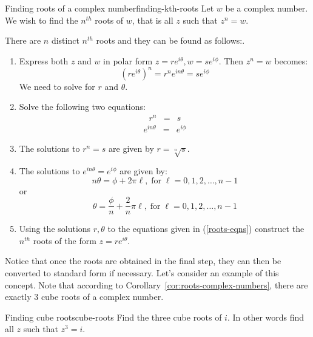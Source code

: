 \begin{procedure}{Finding roots of a complex number}{finding-kth-roots}
Let $w$ be a complex number. We wish to find the $n^{th}$ roots of $w$, that is all $z$ such that $z^n = w$. 

There are $n$ distinct $n^{th}$ roots and they can be found as follows:. 
 
\begin{enumerate}
\item Express both $z$ and $w$ in polar form $z=re^{i\theta}, w=se^{i\phi}$. Then $z^n = w$ becomes:
\[
(re^{i\theta})^n = r^n e^{i n \theta} = se^{i\phi}
\]
We need to solve for $r$ and $\theta$. 
\item Solve the following two equations:
\begin{eqnarray*}
r^n &=& s 
\end{eqnarray*}
\begin{eqnarray}
e^{i n \theta} &=& e^{i \phi}
\label{roots-eqns}
\end{eqnarray}
\item The solutions to $r^n = s$ are given by $r = \sqrt[n]{s}$. 

\item The solutions to $e^{i n \theta} = e^{i \phi}$ are given by:
\[
n\theta = \phi + 2\pi \ell,  \; \mbox{for} \; \ell = 0,1,2,\ldots, n-1
\]
or
\[
\theta = \frac{\phi}{n} + \frac{2}{n} \pi \ell, \; \mbox{for} \; \ell = 0,1,2,\ldots, n-1 
\]
\item
Using the solutions $r, \theta$ to the equations given in (\ref{roots-eqns})
construct the $n^{th}$ roots of the form $z = re^{i\theta}$.  
\end{enumerate}
\end{procedure}

Notice that once the roots are obtained in the final step, they can then be converted to standard form if necessary. Let's consider an example of this concept. Note that according to Corollary~\ref{cor:roots-complex-numbers}, 
there are exactly $3$ cube roots of a complex number.

\begin{example}{Finding cube roots}{cube-roots}
Find the three cube roots of $i$. In other words find all $z$ such that $z^3 = i$. 
\end{example}

